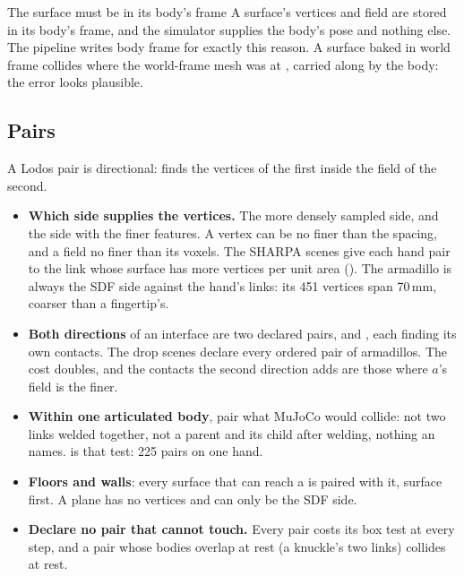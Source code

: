 \begin{notebox}{The surface must be in its body's frame}
A surface's vertices and field are stored in its body's frame, and the simulator supplies the body's pose and nothing else. The pipeline writes body frame for exactly this reason. A surface baked in world frame collides where the world-frame mesh was at , carried along by the body: the error looks plausible.
\end{notebox}

\subsection{Pairs}\label{sec:pairs}

A Lodos pair is directional:  finds the vertices of the first inside the field of the second.

\begin{itemize}
\item \textbf{Which side supplies the vertices.} The more densely sampled side, and the side with the finer features. A vertex can be no finer than the spacing, and a field no finer than its voxels. The SHARPA scenes give each hand pair to the link whose surface has more vertices per unit area (). The armadillo is always the SDF side against the hand's links: its 451 vertices span 70\,mm, coarser than a fingertip's.
\item \textbf{Both directions} of an interface are two declared pairs,  and , each finding its own contacts. The drop scenes declare every ordered pair of armadillos. The cost doubles, and the contacts the second direction adds are those where $a$'s field is the finer.
\item \textbf{Within one articulated body}, pair what MuJoCo would collide: not two links welded together, not a parent and its child after welding, nothing an  names.  is that test: 225 pairs on one hand.
\item \textbf{Floors and walls}: every surface that can reach a  is paired with it, surface first. A plane has no vertices and can only be the SDF side.
\item \textbf{Declare no pair that cannot touch.} Every pair costs its box test at every step, and a pair whose bodies overlap at rest (a knuckle's two links) collides at rest.
\end{itemize}

